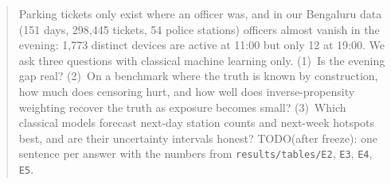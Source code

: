 \begin{abstract}
Parking tickets only exist where an officer was, and in our Bengaluru data (151 days, 298{,}445 tickets, 54 police stations) officers almost vanish in the evening: 1{,}773 distinct devices are active at 11:00 but only 12 at 19:00. We ask three questions with classical machine learning only.
(1)~Is the evening gap real? (2)~On a benchmark where the truth is known by construction, how much does censoring hurt, and how well does inverse-propensity weighting recover the truth as exposure becomes small? (3)~Which classical models forecast next-day station counts and next-week hotspots best, and are their uncertainty intervals honest?
TODO(after freeze): one sentence per answer with the numbers from \texttt{results/tables/E2}, \texttt{E3}, \texttt{E4}, \texttt{E5}.
\end{abstract}
